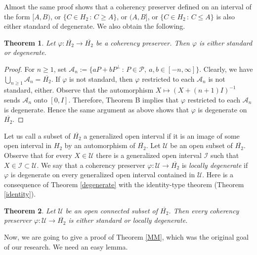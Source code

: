 \documentclass[10pt]{amsart}
\newtheorem{theorem}{Theorem}[section]
\theoremstyle{definition}
\theoremstyle{remark}
\numberwithin{subsection}{section}
\numberwithin{equation}{section}
\newcommand\cP{{\mathcal{P}}}
\newcommand\oH{{\overline{H_2}}}
\begin{document}
Almost the same proof shows that a coherency preserver defined on an interval of the form $[A, B)$, or $\{ C \in H_2 \,: \, C \ge A\}$, or $(A, B]$, or  $\{ C \in H_2 \,: \, C \le A\}$ is also either standard of degenerate.
We also obtain the following. 

\begin{theorem}\label{degeneratex}
Let $\varphi\colon \oH \to \oH$ be a coherency preserver. Then $\varphi$ is either standard or degenerate. 
\end{theorem}
\begin{proof}
For $n\geq 1$, set $\mathcal{A}_n:=\{aP+bP^\perp\,:\, P\in \cP,\ a,b\in [-n, \infty]\}$. 
Clearly, we have $\bigcup_{n\geq 1} \mathcal{A}_n =\oH$.
If $\varphi$ is not standard, then $\varphi$ restricted to each $\mathcal{A}_n$ is not standard, either. 
Observe that the automorphism $X\mapsto (X+(n+1)I)^{-1}$ sends $\mathcal{A}_n$ onto $[0, I]$. 
Therefore, Theorem B implies that $\varphi$ restricted to each $\mathcal{A}_n$ is degenerate. 
Hence the same argument as above shows that $\varphi$ is degenerate on $\oH$.
\end{proof}

Let us call a subset of $\oH$ a generalized open interval  if it is an image of some open interval in $H_2$ by an automorphism of $\oH$. 
Let $\mathcal{U}$ be an open subset of $\oH$. 
Observe that for every $X\in \mathcal{U}$ there is a generalized open interval $\mathcal{I}$ such that $X\in \mathcal{I}\subset \mathcal{U}$. 
We say that a coherency preserver $\varphi\colon \mathcal{U}\to \oH$ is \emph{locally degenerate}  if $\varphi$ is degenerate on every generalized open interval contained in $\mathcal{U}$. 
Here is a consequence of Theorem \ref{degenerate} with the identity-type theorem (Theorem \ref{identity}).

\begin{theorem}\label{locally}
Let $\mathcal{U}$ be an open connected subset of $\oH$. 
Then every coherency preserver $\varphi\colon \mathcal{U}\to \oH$ is either standard or locally degenerate.
\end{theorem}

Now, we are going to give a proof of Theorem \ref{MM}, which was the original goal of our research.
We need an easy lemma. 
\end{document}
